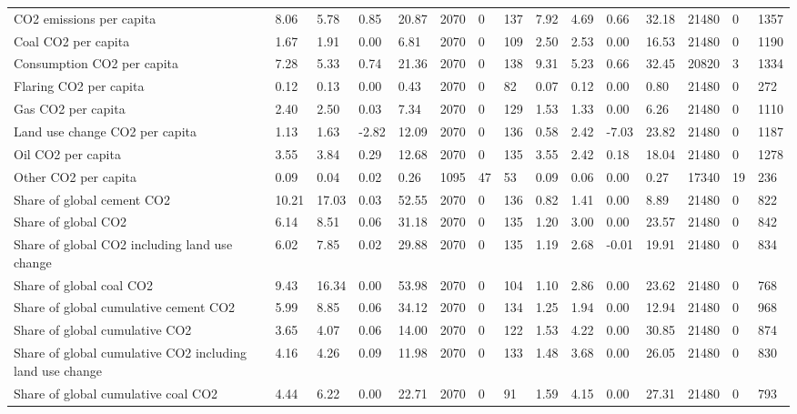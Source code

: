 \begin{longtable}{lllllllllllllll}
CO2 emissions per capita & 8.06 & 5.78 & 0.85 & 20.87 & 2070 & 0 & 137 & 7.92 & 4.69 & 0.66 & 32.18 & 21480 & 0 & 1357\\
Coal CO2 per capita & 1.67 & 1.91 & 0.00 & 6.81 & 2070 & 0 & 109 & 2.50 & 2.53 & 0.00 & 16.53 & 21480 & 0 & 1190\\
\addlinespace
Consumption CO2 per capita & 7.28 & 5.33 & 0.74 & 21.36 & 2070 & 0 & 138 & 9.31 & 5.23 & 0.66 & 32.45 & 20820 & 3 & 1334\\
Flaring CO2 per capita & 0.12 & 0.13 & 0.00 & 0.43 & 2070 & 0 & 82 & 0.07 & 0.12 & 0.00 & 0.80 & 21480 & 0 & 272\\
Gas CO2 per capita & 2.40 & 2.50 & 0.03 & 7.34 & 2070 & 0 & 129 & 1.53 & 1.33 & 0.00 & 6.26 & 21480 & 0 & 1110\\
Land use change CO2 per capita & 1.13 & 1.63 & -2.82 & 12.09 & 2070 & 0 & 136 & 0.58 & 2.42 & -7.03 & 23.82 & 21480 & 0 & 1187\\
Oil CO2 per capita & 3.55 & 3.84 & 0.29 & 12.68 & 2070 & 0 & 135 & 3.55 & 2.42 & 0.18 & 18.04 & 21480 & 0 & 1278\\
\addlinespace
Other CO2 per capita & 0.09 & 0.04 & 0.02 & 0.26 & 1095 & 47 & 53 & 0.09 & 0.06 & 0.00 & 0.27 & 17340 & 19 & 236\\
Share of global cement CO2 & 10.21 & 17.03 & 0.03 & 52.55 & 2070 & 0 & 136 & 0.82 & 1.41 & 0.00 & 8.89 & 21480 & 0 & 822\\
Share of global CO2 & 6.14 & 8.51 & 0.06 & 31.18 & 2070 & 0 & 135 & 1.20 & 3.00 & 0.00 & 23.57 & 21480 & 0 & 842\\
Share of global CO2 including land use change & 6.02 & 7.85 & 0.02 & 29.88 & 2070 & 0 & 135 & 1.19 & 2.68 & -0.01 & 19.91 & 21480 & 0 & 834\\
Share of global coal CO2 & 9.43 & 16.34 & 0.00 & 53.98 & 2070 & 0 & 104 & 1.10 & 2.86 & 0.00 & 23.62 & 21480 & 0 & 768\\
\addlinespace
Share of global cumulative cement CO2 & 5.99 & 8.85 & 0.06 & 34.12 & 2070 & 0 & 134 & 1.25 & 1.94 & 0.00 & 12.94 & 21480 & 0 & 968\\
Share of global cumulative CO2 & 3.65 & 4.07 & 0.06 & 14.00 & 2070 & 0 & 122 & 1.53 & 4.22 & 0.00 & 30.85 & 21480 & 0 & 874\\
Share of global cumulative CO2 including land use change & 4.16 & 4.26 & 0.09 & 11.98 & 2070 & 0 & 133 & 1.48 & 3.68 & 0.00 & 26.05 & 21480 & 0 & 830\\
Share of global cumulative coal CO2 & 4.44 & 6.22 & 0.00 & 22.71 & 2070 & 0 & 91 & 1.59 & 4.15 & 0.00 & 27.31 & 21480 & 0 & 793\\

\end{longtable}
